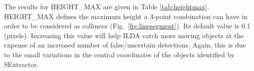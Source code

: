 \documentclass[review]{elsarticle}
\begin{document}
The results for HEIGHT\_MAX are given in Table \ref{tab:heightmax}. HEIGHT\_MAX defines the maximum height a 3-point combination can have in order to be considered as collinear (Fig.~\ref{fig:linesegment}). Its default value is 0.1 (pixels). Increasing this value will help ILDA catch more moving objects at the expense of an increased number of false/uncertain detections. Again, this is due to the small variations in the central coordinates of the objects identified by SExtractor.

\begin{table}[H]
    \begin{subtable}[h]{0.45\textwidth}
        \centering
\end{subtable}
\end{table}
\end{document}
